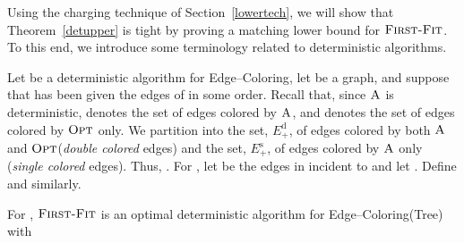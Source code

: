 \documentclass[smallextended]{svjour3}
\def\mck{{\sc Edge--Coloring}\xspace}
\def\mctree{{\sc Edge--Coloring(Tree)}\xspace}
\newcommand{\ed}{\ensuremath{E_{+}^{\text{d}}}\xspace}
\newcommand{\es}{\ensuremath{E_{+}^{\text{s}}}\xspace}
\newcommand{\FF}{\ensuremath{\operatorname{\textsc{First-Fit}}}\xspace}
\newcommand{\OPT}{\ensuremath{\operatorname{\textsc{Opt}}}\xspace}
\newcommand{\ALG}{\ensuremath{\operatorname{\textsc{A}}}\xspace}
\begin{document}
Using the charging technique of Section~\ref{lowertech}, we will show that
 Theorem~\ref{detupper} is tight by proving a matching lower bound for \FF.
To this end, we introduce some terminology related to deterministic
 algorithms.

Let  be a deterministic algorithm for \mck, let  be
 a graph, and suppose that  has been given the edges of  in
 some order.
Recall that, since \ALG is deterministic,  denotes the set of
 edges colored by \ALG, and  denotes the set of edges
 colored by \OPT only.
We partition  into the set, \ed, of edges colored by both \ALG
 and \OPT ({\em double colored} edges) and the set, \es, of edges 
 colored by \ALG only ({\em single colored} edges).
Thus, . 
For , let  be the edges in  incident to 
 and let . Define  and  similarly.


\begin{theorem}
\label{fftree}
For , \FF is an optimal deterministic algorithm for \mctree with

\end{theorem}
\def\cmis{\widehat{c}_x}
\def\cmisv{\widehat{c}_v}
\end{document}
